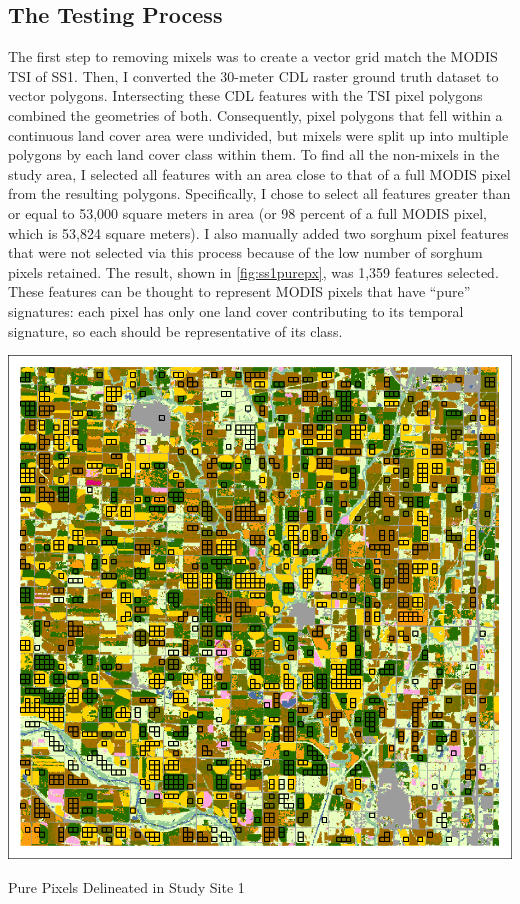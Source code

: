 \subsection*{The Testing Process}

The first step to removing mixels was to create a vector grid match the MODIS TSI of SS1. Then, I converted the 30-meter CDL raster ground truth dataset to vector polygons. Intersecting these CDL features with the TSI pixel polygons combined the geometries of both. Consequently, pixel polygons that fell within a continuous land cover area were undivided, but mixels were split up into multiple polygons by each land cover class within them. To find all the non-mixels in the study area, I selected all features with an area close to that of a full MODIS pixel from the resulting polygons. Specifically, I chose to select all features greater than or equal to 53,000 square meters in area (or 98 percent of a full MODIS pixel, which is 53,824 square meters). I also manually added two sorghum pixel features that were not selected via this process because of the low number of sorghum pixels retained. The result, shown in \autoref{fig:ss1purepx}, was 1,359 features selected. These features can be thought to represent MODIS pixels that have ``pure'' signatures: each pixel has only one land cover contributing to its temporal signature, so each should be representative of its class.

\begin{ssfigure}
  \centering
  \includegraphics[width=.9\textwidth]{Graphics/Testing/clip1_30mCDL_pure_pixels.pdf}
  \caption{Pure Pixels Delineated in Study Site 1}
  \label{fig:ss1purepx}
\end{ssfigure}

